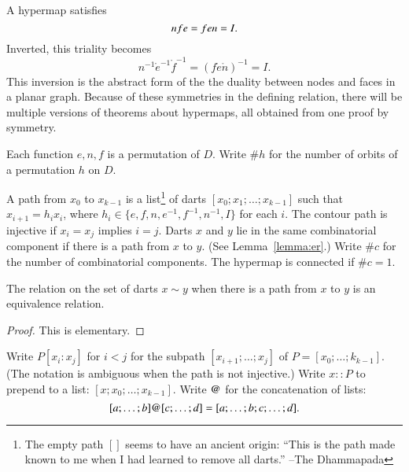 A hypermap satisfies 
  \begin{equation}\tlabel{eqn:triality}
  n\ocirc f\ocirc e = f\ocirc e\ocirc n = I.
  \end{equation}
Inverted, this triality becomes
   $$
   n^{-1} \ocirc e^{-1} \ocirc f^{-1} = (f \ocirc e \ocirc n)^{-1} = I.
   $$
This inversion is the abstract form of the the duality between nodes and faces in a planar graph.  Because of these symmetries in the defining relation, there will be multiple versions of theorems about hypermaps, all obtained from one proof by symmetry.

Each function $e,n,f$ is a permutation of $D$.  Write $\#h$ for the number of orbits of a permutation $h$ on $D$.

\begin{definition}  A path from $x_0$ to $x_{k-1}$ is a list\footnote{The empty path $[]$ seems to have an ancient origin: ``This is the path made known to me when I had learned to remove all darts.'' --The Dhammapada} of darts $[x_0;x_1;\ldots;x_{k-1}]$ such that $x_{i+1} = h_i x_i$, where $h_i \in \{e,f,n,e^{-1},f^{-1},n^{-1},I\}$ for each $i$.   The contour path is injective if $x_i=x_j$ implies $i=j$. Darts $x$ and $y$ lie in the same combinatorial component if there is a path from $x$ to $y$. (See Lemma~\ref{lemma:er}.)  Write $\#c$ for the number of combinatorial components.  The hypermap is connected if $\#c=1$.
\end{definition}

\begin{lemma}\label{lemma:er} The relation on the set of darts $x\sim y$ when there is a path from $x$ to $y$ is an equivalence relation.
\end{lemma}

\begin{proof} This is elementary.
\end{proof}

Write  $P[x_i:x_j]$ for $i<j$ for the subpath $[x_{i+1};\ldots;x_j]$ of $P=[x_0;\ldots;k_{k-1}]$.  (The notation is ambiguous when the path is not injective.)  Write $x::P$ to prepend to a list: $[x;x_0;\ldots;x_{k-1}]$.  Write ${{\operatorname{@}}}$ for the concatenation of lists:
$$
[a;\ldots;b] {{\operatorname{@}}} [c;\ldots;d]  = [a;\ldots;b;c;\ldots;d].
$$


